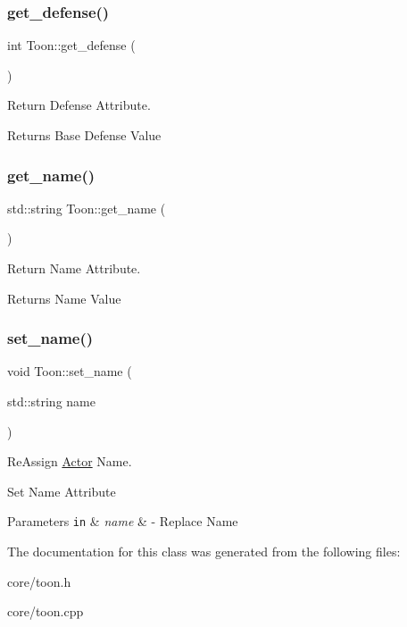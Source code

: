 \subsubsection{\texorpdfstring{get\+\_\+defense()}{get\_defense()}}
{\footnotesize\ttfamily int Toon\+::get\+\_\+defense (\begin{DoxyParamCaption}{ }\end{DoxyParamCaption})}



Return Defense Attribute. 

\begin{DoxyReturn}{Returns}
Base Defense Value 
\end{DoxyReturn}
\mbox{\label{classToon_ad06e0d8f848b3ea7f132a5c540c6fe00}} 
\subsubsection{\texorpdfstring{get\+\_\+name()}{get\_name()}}
{\footnotesize\ttfamily std\+::string Toon\+::get\+\_\+name (\begin{DoxyParamCaption}{ }\end{DoxyParamCaption})}



Return Name Attribute. 

\begin{DoxyReturn}{Returns}
Name Value 
\end{DoxyReturn}
\mbox{\label{classToon_a3153521dfdd2ddb84806629b78f75082}} 
\subsubsection{\texorpdfstring{set\+\_\+name()}{set\_name()}}
{\footnotesize\ttfamily void Toon\+::set\+\_\+name (\begin{DoxyParamCaption}\item[{std\+::string}]{name }\end{DoxyParamCaption})}



Re\+Assign \mbox{\hyperlink{classActor}{Actor}} Name. 

Set Name Attribute 
\begin{DoxyParams}[1]{Parameters}
\mbox{\tt in}  & {\em name} & -\/ Replace Name \\
\hline
\end{DoxyParams}


The documentation for this class was generated from the following files\+:\begin{DoxyCompactItemize}
\item 
core/toon.\+h\item 
core/toon.\+cpp\end{DoxyCompactItemize}

